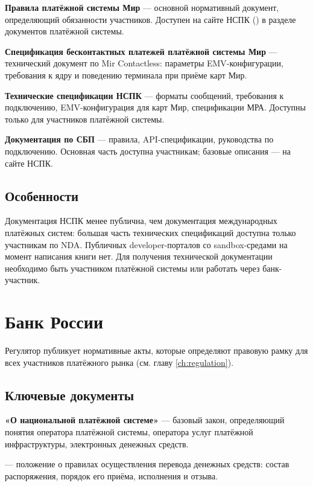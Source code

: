 \textbf{Правила платёжной системы Мир} — основной
нормативный документ, определяющий обязанности участников.
Доступен на сайте НСПК () в разделе
документов платёжной системы.

\textbf{Спецификация бесконтактных платежей платёжной
  системы Мир} — технический документ по Mir Contactless:
параметры EMV-конфигурации, требования к ядру и поведению
терминала при приёме карт Мир.

\textbf{Технические спецификации НСПК} — форматы сообщений,
требования к подключению, EMV-конфигурация для карт Мир,
спецификации МРА. Доступны только для участников
платёжной системы.

\textbf{Документация по СБП} — правила, API-спецификации,
руководства по подключению. Основная часть доступна
участникам; базовые описания — на сайте
НСПК.

\subsection*{Особенности}

Документация НСПК менее публична, чем документация
международных платёжных систем: большая часть технических
спецификаций доступна только участникам по NDA.
Публичных developer-порталов со sandbox-средами
на момент написания книги нет. Для получения технической
документации необходимо быть участником платёжной системы
или работать через банк-участник.

\section{Банк России}
\label{sec:ps-cbr}

Регулятор публикует нормативные акты, которые определяют
правовую рамку для всех участников платёжного
рынка (см. главу \ref{ch:regulation}).

\subsection*{Ключевые документы}

\textbf{ «О национальной платёжной системе»} —
базовый закон, определяющий понятия оператора платёжной
системы, оператора услуг платёжной инфраструктуры,
электронных денежных средств.

\textbf{} — положение о правилах осуществления
перевода денежных средств: состав распоряжения, порядок
его приёма, исполнения и отзыва.

